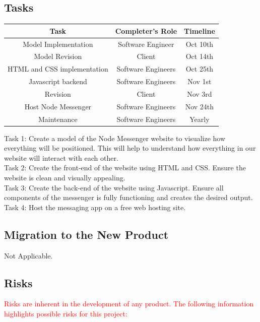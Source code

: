\documentclass[12pt, titlepage]{article}
\begin{document}
{    	\subsection{Tasks}
    	\begin{center}
    		\begin{tabular}{|c|c|c|}
    		\hline 
    		Task & Completer's Role & Timeline \\ 
    		\hline 
    		Model Implementation & Software Engineer & Oct 10th \\ 
    		\hline 
    		Model Revision & Client & Oct 14th \\ 
    		\hline 
    		HTML and CSS implementation & Software Engineers & Oct 25th \\ 
    		\hline 
    		Javascript backend & Software Engineers &  Nov 1st\\ 
    		\hline 
    		Revision & Client & Nov 3rd \\ 
    		\hline 
    		Host Node Messenger& Software Engineers & Nov 24th \\ 
    		\hline 
    		Maintenance & Software Engineers & Yearly \\ 
    		\hline 
    	\end{tabular} 
    	\end{center}
		Task 1: Create a model of the Node Messenger website to visualize how everything will be positioned. This will help to understand how everything in our website will interact with each other.\\
		Task 2: Create the front-end of the website using HTML and CSS. Ensure the website is clean and visually appealing.\\
		Task 3: Create the back-end of the website using Javascript. Ensure all components of the messenger is fully functioning and creates the desired output. Task 4: Host the messaging app on a free web hosting site.

    	\subsection{Migration to the New Product}
    	Not Applicable.

    	\subsection{Risks}
    	\textcolor{red}{Risks are inherent in the development of any product. The following information highlights possible risks for this project: \\}
    	
}
\end{document}
